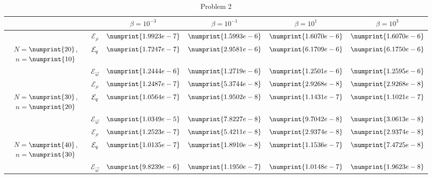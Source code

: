 \begin{table}
\begin{tabular}{ ||c|| c | c | c | c | c ||}
\hline
& & $\beta = 10^{-3}$ & $\beta = 10^{-1}$ & $\beta = 10^{1}$ & $\beta = 10^{3}$  \\
\hline
 & $\mathcal{E}_\rho$ & $\numprint{1.9923e-7}$ & $\numprint{1.5993e-6}$ & $\numprint{1.6070e-6}$ & $\numprint{1.6070e-6}$ \\
 $N = $$\numprint{20}$, $n = $$\numprint{10}$  & $\mathcal{E}_q$ & $\numprint{1.7247e-7}$ & $\numprint{2.9581e-6}$ & $\numprint{6.1709e-6}$ & $\numprint{6.1750e-6}$ \\
& $\mathcal{E}_{\vec{w}}$ & $\numprint{1.2444e-6}$ & $\numprint{1.2719e-6}$ & $\numprint{1.2501e-6}$ & $\numprint{1.2595e-6}$ \\
\hline
 & $\mathcal{E}_\rho$ & $\numprint{1.2487e-7}$ & $\numprint{5.3744e-8}$ & $\numprint{2.9268e-8}$ & $\numprint{2.9268e-8}$ \\
 $N = $$\numprint{30}$, $n = $$\numprint{20}$  & $\mathcal{E}_q$ & $\numprint{1.0564e-7}$ & $\numprint{1.9502e-8}$ & $\numprint{1.1431e-7}$ & $\numprint{1.1021e-7}$ \\
& $\mathcal{E}_{\vec{w}}$ & $\numprint{1.0349e-5}$ & $\numprint{7.8227e-8}$ & $\numprint{9.7042e-8}$ & $\numprint{3.0613e-8}$ \\
\hline
 & $\mathcal{E}_\rho$ & $\numprint{1.2523e-7}$ & $\numprint{5.4211e-8}$ & $\numprint{2.9374e-8}$ & $\numprint{2.9374e-8}$ \\
 $N = $$\numprint{40}$, $n = $$\numprint{30}$  & $\mathcal{E}_q$ & $\numprint{1.0135e-7}$ & $\numprint{1.8910e-8}$ & $\numprint{1.1536e-7}$ & $\numprint{7.4725e-8}$ \\
& $\mathcal{E}_{\vec{w}}$ & $\numprint{9.8239e-6}$ & $\numprint{1.1950e-7}$ & $\numprint{1.0148e-7}$ & $\numprint{1.9623e-8}$ \\
\hline
\end{tabular}
\caption{Problem 2}
\label{TabA1:Prob2}
\end{table}